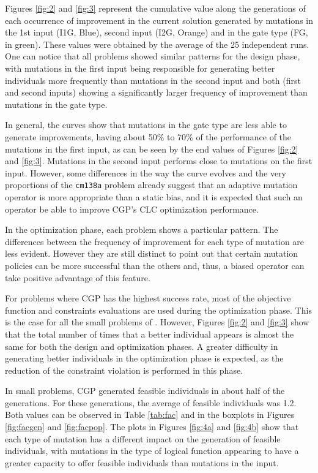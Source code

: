 Figures \ref{fig:2} and \ref{fig:3} represent the cumulative value along the generations of each occurrence of improvement  in the current solution generated by mutations in the 1st input (I1G, Blue), second input (I2G, Orange) and  in the gate type (FG, in green). These values were obtained by the average of the 25 independent runs. One can notice that all problems showed similar patterns for the design phase, with mutations in the first input being responsible for generating better individuals more frequently than mutations in the second input and both (first and second inputs) showing a significantly larger frequency of improvement than mutations in the gate type.

In general, the curves show that mutations in the gate type are less able to generate improvements, having about 50\% to 70\% of the performance of the mutations in the first input, as can be seen by the end values of Figures \ref{fig:2} and \ref{fig:3}. Mutations in the second input performs close to mutations on the first input. However, some differences in the way the curve evolves and the very proportions of the {\tt cm138a} problem already suggest that an adaptive mutation operator is more appropriate than a static bias, and it is expected that such an operator be able to improve CGP's CLC optimization performance. %

In the optimization phase, each problem shows a particular pattern. The differences between the frequency of improvement for each type of mutation are less evident. However they are still distinct  to point out that certain mutation policies can be more successful than the others and, thus, a biased operator can take positive advantage of this feature.

For problems where CGP has the highest success rate, most of the objective function and constraints evaluations are used during the optimization phase. This is the case for all the small problems of \cite{benchmark}. However, Figures \ref{fig:2} and \ref{fig:3} show that the total number of times that a better individual appears is almost the same for both the design and optimization phases. A greater difficulty in generating better individuals in the optimization phase is expected, as the reduction of the constraint violation is performed in this phase.

In small problems, CGP generated feasible individuals in about half of the generations. For these generations, the average of feasible individuals was 1.2. Both values can be observed in Table \ref{tab:fac} and in the boxplots in Figures \ref{fig:facgen} and  \ref{fig:facpop}. The plots in Figures \ref{fig:4a} and \ref{fig:4b} show that each type of mutation has a different impact on the generation of feasible individuals, with mutations in the type of logical function appearing to have a greater capacity to offer feasible individuals than mutations in the input. 

